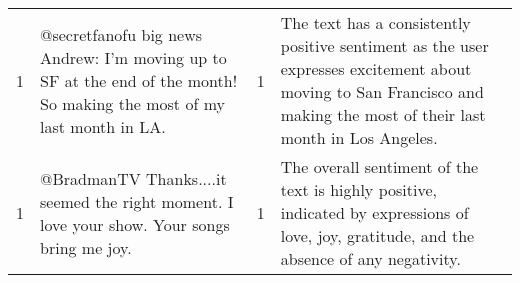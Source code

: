 \begin{tabular}{r{1cm} p{0.4in} r{1cm} p{0.4in}}
1 & @secretfanofu big news Andrew: I'm moving up to SF at the end of the month! So making the most of my last month in LA.  & 1 & The text has a consistently positive sentiment as the user expresses excitement about moving to San Francisco and making the most of their last month in Los Angeles. \\
1 & @BradmanTV Thanks....it seemed the right moment. I love your show.  Your songs bring me joy. & 1 & The overall sentiment of the text is highly positive, indicated by expressions of love, joy, gratitude, and the absence of any negativity. \\
\bottomrule
\end{tabular}
